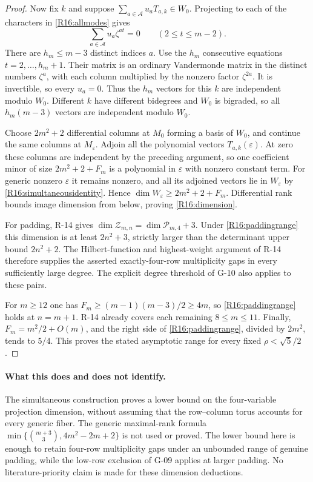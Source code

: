 \begin{proof}
Now fix $k$ and suppose
$\sum_{a\in\mathcal A}u_aT_{a,k}\in W_0$.
Projecting to each of the characters in
\eqref{R16:allmodes} gives
\[
 \sum_{a\in\mathcal A}u_a\zeta^{at}=0
 \qquad(2\leq t\leq m-2).
\]
There are $h_m\leq m-3$ distinct indices $a$.
Use the $h_m$ consecutive equations
$t=2,\ldots,h_m+1$. Their matrix is an ordinary
Vandermonde matrix in the distinct numbers $\zeta^a$,
with each column multiplied by the nonzero factor
$\zeta^{2a}$. It is invertible, so every $u_a=0$.
Thus the $h_m$ vectors for this $k$ are independent
modulo $W_0$. Different $k$ have different bidegrees
and $W_0$ is bigraded, so all $h_m(m-3)$ vectors are
independent modulo $W_0$.

Choose $2m^2+2$ differential columns at $M_0$ forming a
basis of $W_0$, and continue the same columns at
$M_\varepsilon$. Adjoin all the polynomial vectors
$T_{a,k}(\varepsilon)$. At zero these columns are
independent by the preceding argument, so one coefficient
minor of size $2m^2+2+F_m$ is a polynomial in
$\varepsilon$ with nonzero constant term. For generic
nonzero $\varepsilon$ it remains nonzero, and all its
adjoined vectors lie in $W_\varepsilon$ by
\eqref{R16:simultaneousidentity}. Hence
$\dim W_\varepsilon\geq2m^2+2+F_m$.
Differential rank bounds image dimension from below,
proving \eqref{R16:dimension}.

For padding, R-14 gives
$\dim\mathcal Z_{m,n}=\dim\mathcal P_{m,4}+3$.
Under \eqref{R16:paddingrange} this dimension is at least
$2n^2+3$, strictly larger than the determinant upper
bound $2n^2+2$. The Hilbert-function and highest-weight
argument of R-14 therefore supplies the asserted
exactly-four-row multiplicity gaps in every sufficiently
large degree. The explicit degree threshold of G-10
also applies to these pairs.

For $m\geq12$ one has
$F_m\geq(m-1)(m-3)/2\geq4m$, so
\eqref{R16:paddingrange} holds at $n=m+1$.
R-14 already covers each remaining $8\leq m\leq11$.
Finally, $F_m=m^2/2+O(m)$, and the right side of
\eqref{R16:paddingrange}, divided by $2m^2$, tends to
$5/4$. This proves the stated asymptotic range for every
fixed $\rho<\sqrt5/2$.
\end{proof}

\paragraph{What this does and does not identify.}
The simultaneous construction proves a lower bound on the
four-variable projection dimension, without assuming that
the row--column torus accounts for every generic fiber.
The generic maximal-rank formula
$\min\{\binom{m+3}{3},4m^2-2m+2\}$ is not used or proved.
The lower bound here is enough to retain four-row
multiplicity gaps under an unbounded range of genuine
padding, while the low-row exclusion of G-09 applies at
larger padding. No literature-priority claim is made for
these dimension deductions.


